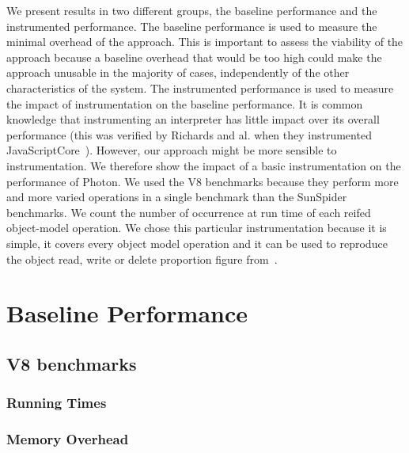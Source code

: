 We present results in two different groups, the baseline performance and the
instrumented performance.  The baseline performance is used to measure the
minimal overhead of the approach.  This is important to assess the viability of
the approach because a baseline overhead that would be too high could make the
approach unusable in the majority of cases, independently of the other
characteristics of the system. The instrumented performance is used to measure
the impact of instrumentation on the baseline performance. It is common
knowledge that instrumenting an interpreter has little impact over its overall
performance (this was verified by Richards and al. when they instrumented
JavaScriptCore~\cite{behavior_js}). However, our approach might be more
sensible to instrumentation. We therefore show the impact of a basic
instrumentation on the performance of Photon. We used the V8 benchmarks because
they perform more and more varied operations in a single benchmark than the
SunSpider benchmarks. We count the number of occurrence at run time of each
reifed object-model operation. We chose this particular instrumentation because
it is simple, it covers every object model operation and it can be used to
reproduce the object read, write or delete proportion figure
from~\cite{behavior_js}.


\section{Baseline Performance}

\subsection{V8 benchmarks}

\subsubsection{Running Times}



\subsubsection{Memory Overhead}


